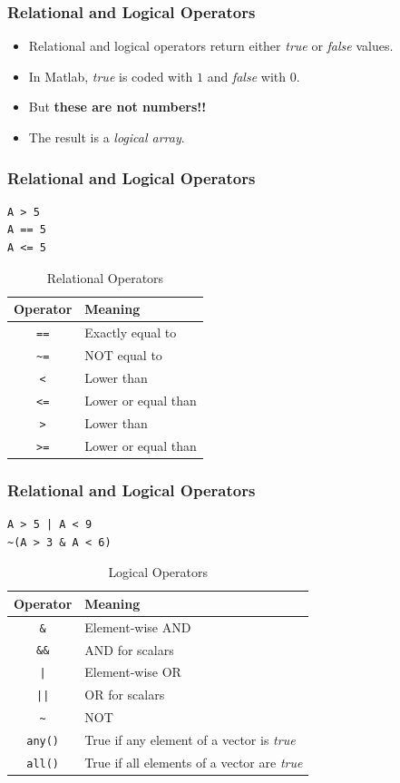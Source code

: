 \documentclass[11pt,xcolor={svgnames},aspectratio=169,usepdftitle=false]{beamer}
\begin{document}
\begin{frame}
    \frametitle{Relational and Logical Operators}
\begin{itemize}
    \item Relational and logical operators return either \textit{true} or \textit{false} values.
    \item In Matlab, \textit{true} is coded with $1$ and \textit{false} with $0$.
    \item But \alert{\textbf{these are not numbers!!}}
    \item The result is a \textit{logical array}.
\end{itemize}
\end{frame}

\begin{frame}[fragile]
    \frametitle{Relational and Logical Operators}
\begin{lstlisting}
A > 5
A == 5
A <= 5
\end{lstlisting}

\begin{table}[htbp]
    \caption{Relational Operators}
    \label{tab:relational_operators}
    \begin{tabular}{@{}cl@{}}
    \toprule
    Operator & Meaning \\ \midrule
    \verb;==; & Exactly equal to \\
    \verb;~=; & NOT equal to \\
    \verb;<;  & Lower than \\
    \verb;<=; & Lower or equal than \\
    \verb;>;  & Lower than \\
    \verb;>=; & Lower or equal than \\ \bottomrule
    \end{tabular}
\end{table}
\end{frame}

\begin{frame}[fragile]
    \frametitle{Relational and Logical Operators}
\begin{lstlisting}
A > 5 | A < 9
~(A > 3 & A < 6)
\end{lstlisting}

\begin{table}[htbp]
    \caption{Logical Operators}
    \label{tab:logical_operators}
    \begin{tabular}{@{}cl@{}}
    \toprule
    Operator & Meaning \\ \midrule
    \verb;&; & Element-wise AND \\
    \verb;&&; & AND for scalars \\
    \verb;|;  & Element-wise OR \\
    \verb;||; & OR for scalars \\
    \verb;~;  & NOT \\ 
    \verb;any(); & True if any element of a vector is \textit{true} \\
    \verb;all(); & True if all elements of a vector are \textit{true} \\ \bottomrule
    \end{tabular}
\end{table}
\end{frame}
\end{document}
